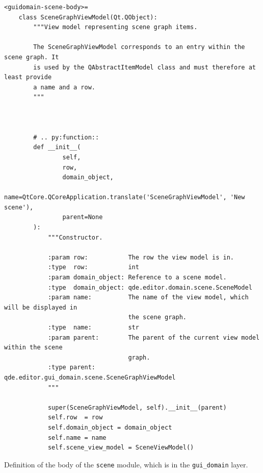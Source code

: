 \documentclass[10pt, openright, notitlepage]{scrreprt}
\begin{document}
\begin{listing}[H]
\begin{verbatim}
<guidomain-scene-body>=
    class SceneGraphViewModel(Qt.QObject):
        """View model representing scene graph items.
    
        The SceneGraphViewModel corresponds to an entry within the scene graph. It
        is used by the QAbstractItemModel class and must therefore at least provide
        a name and a row.
        """
    
        
    
        # .. py:function::
        def __init__(
                self,
                row,
                domain_object,
                name=QtCore.QCoreApplication.translate('SceneGraphViewModel', 'New scene'),
                parent=None
        ):
            """Constructor.
        
            :param row:           The row the view model is in.
            :type  row:           int
            :param domain_object: Reference to a scene model.
            :type  domain_object: qde.editor.domain.scene.SceneModel
            :param name:          The name of the view model, which will be displayed in
                                  the scene graph.
            :type  name:          str
            :param parent:        The parent of the current view model within the scene
                                  graph.
            :type parent:         qde.editor.gui_domain.scene.SceneGraphViewModel
            """
        
            super(SceneGraphViewModel, self).__init__(parent)
            self.row  = row
            self.domain_object = domain_object
            self.name = name
            self.scene_view_model = SceneViewModel()
\end{verbatim}
\caption{\label{lst:guidomain-scene-scenegraphviewmodel}
Definition of the body of the \texttt{scene} module, which is in the \texttt{gui\_domain} layer.}
\end{listing}
\end{document}
